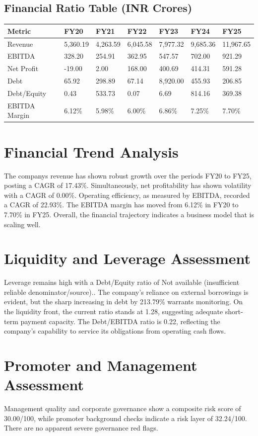 \documentclass[11pt,a4paper]{article}
\begin{document}
\subsection*{Financial Ratio Table (INR Crores)}
\begin{longtable}{p{3.2cm} p{1.8cm} p{1.8cm} p{1.8cm} p{1.8cm} p{1.8cm} p{1.8cm}}
\toprule
Metric & FY20 & FY21 & FY22 & FY23 & FY24 & FY25 \\
\midrule
\endhead
Revenue & 5,360.19 & 4,263.59 & 6,045.58 & 7,977.32 & 9,685.36 & 11,967.65 \\
EBITDA & 328.20 & 254.91 & 362.95 & 547.57 & 702.00 & 921.29 \\
Net Profit & -19.00 & 2.00 & 168.00 & 400.69 & 414.31 & 591.28 \\
Debt & 65.92 & 298.89 & 67.14 & 8,920.00 & 455.93 & 206.85 \\
Debt/Equity & 0.43 & 533.73 & 0.07 & 6.69 & 814.16 & 369.38 \\
EBITDA Margin & 6.12\% & 5.98\% & 6.00\% & 6.86\% & 7.25\% & 7.70\% \\
\bottomrule
\end{longtable}

\section*{Financial Trend Analysis}
The companys revenue has shown robust growth over the periods FY20 to FY25, posting a CAGR of 17.43\%. Simultaneously, net profitability has shown volatility with a CAGR of 0.00\%. Operating efficiency, as measured by EBITDA, recorded a CAGR of 22.93\%. The EBITDA margin has moved from 6.12\% in FY20 to 7.70\% in FY25. Overall, the financial trajectory indicates a business model that is scaling well.

\section*{Liquidity and Leverage Assessment}
Leverage remains high with a Debt/Equity ratio of Not available (insufficient reliable denominator/source).. The company's reliance on external borrowings is evident, but the sharp increasing in debt by 213.79\% warrants monitoring. On the liquidity front, the current ratio stands at 1.28, suggesting adequate short-term payment capacity. The Debt/EBITDA ratio is 0.22, reflecting the company's capability to service its obligations from operating cash flows.

\section*{Promoter and Management Assessment}
Management quality and corporate governance show a composite risk score of 30.00/100, while promoter background checks indicate a risk layer of 32.24/100. There are no apparent severe governance red flags.
\end{document}
